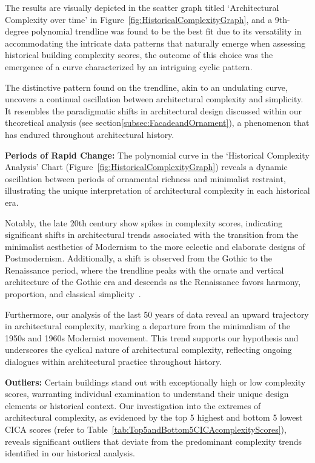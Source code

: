 The results are visually depicted in the scatter graph titled `Architectural Complexity over time' in Figure~\ref{fig:HistoricalComplexityGraph}, and a 9th-degree polynomial trendline was found to be the best fit due to its versatility in accommodating the intricate data patterns that naturally emerge when assessing historical building complexity scores, the outcome of this choice was the emergence of a curve characterized by an intriguing cyclic pattern.

The distinctive pattern found on the trendline, akin to an undulating curve, uncovers a continual oscillation between architectural complexity and simplicity.
It resembles the paradigmatic shifts in architectural design discussed within our theoretical analysis (see section\ref{subsec:FacadeandOrnament}), a phenomenon that has endured throughout architectural history.

\textbf{Periods of Rapid Change:}
The polynomial curve in the `Historical Complexity Analysis' Chart (Figure~\ref{fig:HistoricalComplexityGraph}) reveals a dynamic oscillation between periods of ornamental richness and minimalist restraint, illustrating the unique interpretation of architectural complexity in each historical era.

Notably, the late 20th century show spikes in complexity scores, indicating significant shifts in architectural trends associated with the transition from the minimalist aesthetics of Modernism to the more eclectic and elaborate designs of Postmodernism.
Additionally, a shift is observed from the Gothic to the Renaissance period, where the trendline peaks with the ornate and vertical architecture of the Gothic era and descends as the Renaissance favors harmony, proportion, and classical simplicity~\cite{Stacbond2020}.

Furthermore, our analysis of the last 50 years of data reveal an upward trajectory in architectural complexity, marking a departure from the minimalism of the 1950s and 1960s Modernist movement.
This trend supports our hypothesis and underscores the cyclical nature of architectural complexity, reflecting ongoing dialogues within architectural practice throughout history.

\textbf{Outliers:} Certain buildings stand out with exceptionally high or low complexity scores, warranting individual examination to understand their unique design elements or historical context.
Our investigation into the extremes of architectural complexity, as evidenced by the top 5 highest and bottom 5 lowest CICA scores (refer to Table~\ref{tab:Top5andBottom5CICAcomplexityScores}), reveals significant outliers that deviate from the predominant complexity trends identified in our historical analysis.

